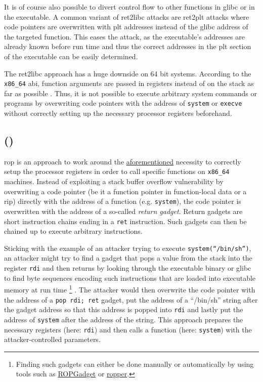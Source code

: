 It is of course also possible to divert control flow to other functions in \gls{glibc} or in the executable.
A common variant of \gls{ret2libc} attacks are \gls{ret2plt} attacks where code pointers are overwritten with \gls{plt} addresses instead of the \gls{glibc} address of the targeted function.
This eases the attack, as the executable's addresses are already known before run time and thus the correct addresses in the \gls{plt} section of the executable can be easily determined.

The \gls{ret2libc} approach has a huge downside on 64 bit systems.
According to the \texttt{x86\_64} \gls{abi}, function arguments are passed in registers instead of on the stack as far as possible \cites[19\psqq]{Lu2018}[17\psqq]{Fog2019}.
Thus, it is not possible to execute arbitrary system commands or programs by overwriting code pointers with the address of \texttt{system} or \texttt{execve} without correctly setting up the necessary processor registers beforehand.


\subsection{ ()}
\label{subsec:cr-rop}

\gls{rop} is an approach to work around the \hyperref[subsec:cr-ret2libc]{aforementioned} necessity to correctly setup the processor registers in order to call specific functions on \texttt{x86\_64} machines.
Instead of exploiting a stack buffer overflow vulnerability by overwriting a code pointer (be it a function pointer in function-local data or a \gls{rip}) directly with the address of a function (e.g. \texttt{system}), the code pointer is overwritten with the address of a so-called \emph{return gadget}.
Return gadgets are short instruction chains ending in a \texttt{ret} instruction.
Such gadgets can then be chained up to execute arbitrary instructions.

Sticking with the example of an attacker trying to execute \texttt{system(``/bin/sh'')}, an attacker might try to find a gadget that pops a value from the stack into the register \texttt{rdi} and then returns by looking through the executable binary or \gls{glibc} to find byte sequences encoding such instructions that are loaded into executable memory at run time%
	\footnote{Finding such gadgets can either be done manually or automatically by using tools such as \href{https://github.com/JonathanSalwan/ROPgadget}{ROPGadget} or \href{https://github.com/sashs/Ropper}{ropper}.}%
.
The attacker would then overwrite the code pointer with the address of a \texttt{pop rdi; ret} gadget, put the address of a ``/bin/sh'' string after the gadget address so that this address is popped into \texttt{rdi} and lastly put the address of \texttt{system} after the address of the string.
This approach prepares the necessary registers (here: \texttt{rdi}) and then calls a function (here: \texttt{system}) with the attacker-controlled parameters.

